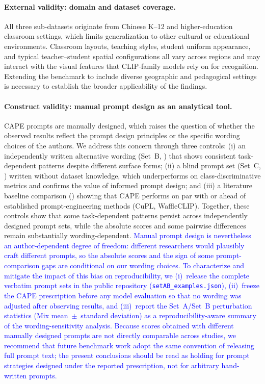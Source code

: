\documentclass[symmetry,article,submit,pdftex,moreauthors]{Definitions/mdpi}
\newcommand{\rev}[1]{\textcolor{blue}{#1}}
\begin{document}
\paragraph{External validity: domain and dataset coverage.}
All three sub-datasets originate from Chinese K--12 and higher-education classroom settings, which limits generalization to other cultural or educational environments. Classroom layouts, teaching styles, student uniform appearance, and typical teacher--student spatial configurations all vary across regions and may interact with the visual features that CLIP-family models rely on for recognition. Extending the benchmark to include diverse geographic and pedagogical settings is necessary to establish the broader applicability of the findings.

\paragraph{Construct validity: manual prompt design as an analytical tool.}
CAPE prompts are manually designed, which raises the question of whether the observed results reflect the prompt design principles or the specific wording choices of the authors. We address this concern through three controls: (i) an independently written alternative wording (Set~B, ) that shows consistent task-dependent patterns despite different surface forms; (ii) a blind prompt set (Set~C, ) written without dataset knowledge, which underperforms on class-discriminative metrics and confirms the value of informed prompt design; and (iii) a literature baseline comparison () showing that CAPE performs on par with or ahead of established prompt-engineering methods (CuPL, WaffleCLIP). Together, these controls show that some task-dependent patterns persist across independently designed prompt sets, while the absolute scores and some pairwise differences remain substantially wording-dependent. \rev{Manual prompt design is nevertheless an author-dependent degree of freedom: different researchers would plausibly craft different prompts, so the absolute scores and the sign of some prompt-comparison gaps are conditional on our wording choices. To characterize and mitigate the impact of this bias on reproducibility, we (i)~release the complete verbatim prompt sets in the public repository (\texttt{setAB\_examples.json}), (ii)~freeze the CAPE prescription before any model evaluation so that no wording was adjusted after observing results, and (iii)~report the Set~A/Set~B perturbation statistics (Mix mean~$\pm$~standard deviation) as a reproducibility-aware summary of the wording-sensitivity analysis. Because scores obtained with different manually designed prompts are not directly comparable across studies, we recommend that future benchmark work adopt the same convention of releasing full prompt text; the present conclusions should be read as holding for prompt strategies designed under the reported prescription, not for arbitrary hand-written prompts.}
\end{document}
